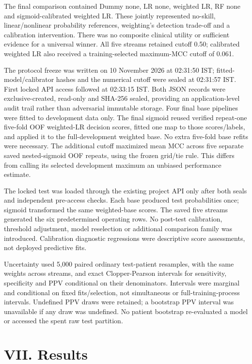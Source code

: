 \documentclass[10pt,twocolumn,letterpaper]{article}
\begin{document}
The final comparison contained Dummy none, LR none, weighted LR, RF none and sigmoid-calibrated weighted LR. These jointly represented no-skill, linear/nonlinear probability references, weighting's detection trade-off and a calibration intervention. There was no composite clinical utility or sufficient evidence for a universal winner. All five streams retained cutoff 0.50; calibrated weighted LR also received a training-selected maximum-MCC cutoff of 0.061.


The protocol freeze was written on 10 November 2026 at 02:31:50 IST; fitted-model/calibrator hashes and the numerical cutoff were sealed at 02:31:57 IST. First locked API access followed at 02:33:15 IST. Both JSON records were exclusive-created, read-only and SHA-256 sealed, providing an application-level audit trail rather than adversarial immutable storage. Four final base pipelines were fitted to development data only. The final sigmoid reused verified repeat-one five-fold OOF weighted-LR decision scores, fitted one map to those scores/labels, and applied it to the full-development weighted base. No extra five-fold base refits were necessary. The additional cutoff maximized mean MCC across five separate saved nested-sigmoid OOF repeats, using the frozen grid/tie rule. This differs from calling its selected development maximum an unbiased performance estimate.


The locked test was loaded through the existing project API only after both seals and independent pre-access checks. Each base produced test probabilities once; sigmoid transformed the same weighted-base scores. The saved five streams generated the six predetermined operating rows. No post-test calibration, threshold adjustment, model reselection or additional comparison family was introduced. Calibration diagnostic regressions were descriptive score assessments, not deployed predictive fits.


Uncertainty used 5,000 paired ordinary test-patient resamples, with the same weights across streams, and exact Clopper-Pearson intervals for sensitivity, specificity and PPV conditional on their denominators. Intervals were marginal and conditional on fixed fits/selection, not simultaneous or full-training-process intervals. Undefined PPV draws were retained; a bootstrap PPV interval was unavailable if any draw was undefined. No patient bootstrap re-evaluated a model or accessed the spent raw test partition.


\section*{VII. Results}
\end{document}
